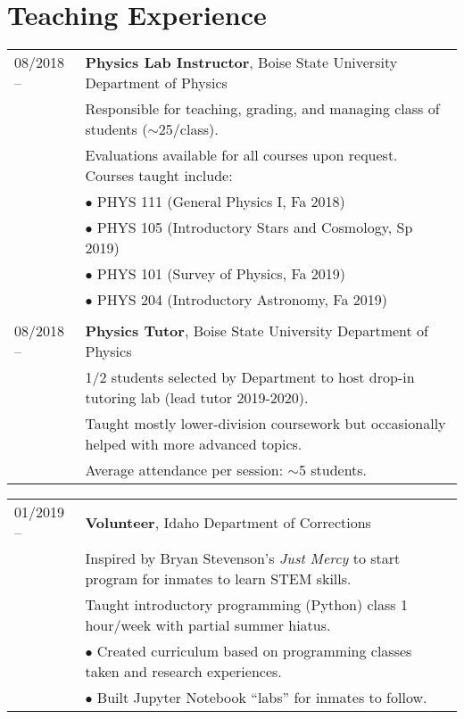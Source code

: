 \documentclass[11pt]{article}
\begin{document}
\section{Teaching Experience}
\begin{tabular}{ll}
08/2018 --		& 	\textbf{Physics Lab Instructor}, Boise State University Department of Physics \vspace{1mm} \\
      & Responsible for teaching, grading, and managing class of students ($\sim$25/class).\\
      & Evaluations available for all courses upon request. Courses taught include: \vspace{2mm} \\
      & $\bullet$ PHYS 111 (General Physics I, Fa 2018)\\
      & $\bullet$ PHYS 105 (Introductory Stars and Cosmology, Sp 2019)\\
      & $\bullet$ PHYS 101 (Survey of Physics, Fa 2019)\\
      & $\bullet$ PHYS 204 (Introductory Astronomy, Fa 2019)\\
      & \\
08/2018 --    &   \textbf{Physics Tutor}, Boise State University Department of Physics \vspace{1mm} \\
      & 1/2 students selected by Department to host drop-in tutoring lab (lead tutor 2019-2020).\\
      & Taught mostly lower-division coursework but occasionally helped with more advanced topics.\\
      & Average attendance per session: $\sim$5 students.\\

\end{tabular}
\newpage
\begin{tabular}{ll}
01/2019 --    &   \textbf{Volunteer}, Idaho Department of Corrections \\
      & Inspired by Bryan Stevenson's \textit{Just Mercy} to start program for inmates to learn STEM skills.\vspace{2mm} \\
      & Taught introductory programming (Python) class 1 hour/week with partial summer hiatus.\\
      & $\bullet$ Created curriculum based on programming classes taken and research experiences.\\
      & $\bullet$ Built Jupyter Notebook ``labs'' for inmates to follow.
\end{tabular}
\end{document}
